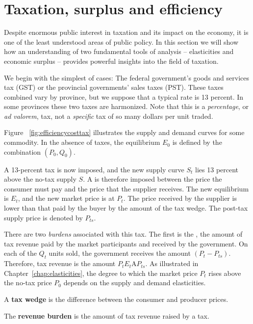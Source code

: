 \section{Taxation, surplus and efficiency}\label{sec:ch5sec4}

Despite enormous public interest in taxation and its impact on the economy,
it is one of the least understood areas of public policy. In this section we
will show how an understanding of two fundamental tools of
analysis -- elasticities and economic surplus -- provides powerful insights
into the field of taxation.

We begin with the simplest of cases: The federal government's goods and
services tax (GST) or the provincial governments' sales taxes (PST). These
taxes combined vary by province, but we suppose that a typical rate is 13
percent. In some provinces these two taxes are harmonized. Note that
this is a \textit{percentage}, or \textit{ad valorem},
tax, not a \textit{specific} tax of so many dollars per unit traded. 



\newhtmlpage

Figure~
\ref{fig:efficiencycosttax} illustrates the supply and demand curves for
some commodity. In the absence of taxes, the equilibrium $E_0$ is defined by
the combination $(P_0, Q_0)$. 

A 13-percent tax is now imposed, and the new supply curve $S_t$ lies 13
percent above the no-tax supply $S$. A  is therefore
imposed between the price the consumer must pay and the price that the
supplier receives. The new equilibrium is $E_t$, and the new market price is
at $P_t$. The price received by the supplier is lower than that paid by the
buyer by the amount of the tax wedge. The post-tax supply price is denoted
by $P_{ts}$.

There are two \textit{burdens} associated with this tax. The first is the %
, the amount of tax revenue paid by the market
participants and received by the government. On each of the $Q_t$ units
sold, the government receives the amount $(P_t-P_{ts})$. Therefore, tax
revenue is the amount $P_{t}E_{t}$A$P_{ts}$. As illustrated in Chapter~\ref{chap:elasticities},
the degree to which the market price $P_t$ rises
above the no-tax price $P_0$ depends on the supply and demand elasticities.

\begin{DefBox}
A \textbf{tax wedge} is the difference between the consumer and producer prices.

The \textbf{revenue burden} is the amount of tax revenue raised by a tax.
\end{DefBox}

